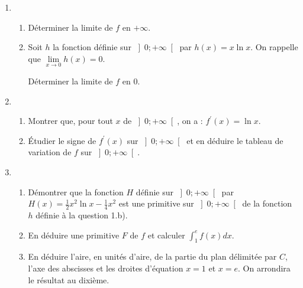 \begin{enumerate}
     \item
     \begin{enumerate}[label=\alph*.]
          \item
          Déterminer la limite de $f$ en $+\infty $.
          \item
          Soit $h$ la fonction définie sur $\left]0 ; +\infty \right[$ par $h\left(x\right)=x\ln x$. On rappelle que $\lim\limits_{x\rightarrow 0}h\left(x\right)=0$.
          \par
          Déterminer la limite de $f$ en 0.
     \end{enumerate}
     \item
     \begin{enumerate}[label=\alph*.]
          \item
          Montrer que, pour tout $x$ de $\left]0 ; +\infty \right[$, on a : $f^{\prime}\left(x\right)=\ln x$.
          \item
          Étudier le signe de $f^{\prime}\left(x\right)$ sur $\left]0 ; +\infty \right[$ et en déduire le tableau de variation de $f$ sur $\left]0 ; +\infty \right[$.
     \end{enumerate}
     \item
     \begin{enumerate}[label=\alph*.]
          \item
          Démontrer que la fonction $H$ définie sur $\left]0 ; +\infty \right[$ par $H\left(x\right)=\frac{1}{2}x^{2} \ln x-\frac{1}{4} x^{2}$ est une primitive sur $\left]0 ; +\infty \right[$ de la fonction $h$ définie à la question 1.b).
          \item
          En déduire une primitive $F$ de $f$ et calculer $\int_{1}^{e}f\left(x\right)dx$.
          \item
          En déduire l'aire, en unités d'aire, de la partie du plan délimitée par $C$, l'axe des abscisses et les droites d'équation $x=1$ et $x=e$. On arrondira le résultat au dixième.
     \end{enumerate}
\end{enumerate}

